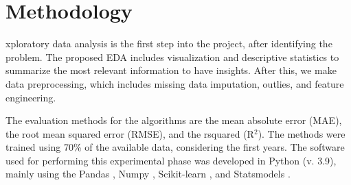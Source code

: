\section{Methodology}
\label{sec:methodology}

xploratory data analysis is the first step into the project, after
identifying the problem. The proposed EDA includes visualization and descriptive statistics to
summarize the most relevant information to have insights. After this, we make
data preprocessing, which includes missing data imputation, outlies, and
feature engineering.   

The evaluation methods for the algorithms are the mean absolute error (MAE), the root
mean squared error (RMSE), and the rsquared (R$^2$). The methods were
trained using 70\% of the available data, considering the first years. The
software used for performing this experimental phase was developed in Python
(v. 3.9), mainly using the Pandas \cite{pandas1,pandas2}, Numpy
\cite{numpy}, Scikit-learn \cite{scikit-learn}, and Statsmodels \cite{statsmodels}. 
